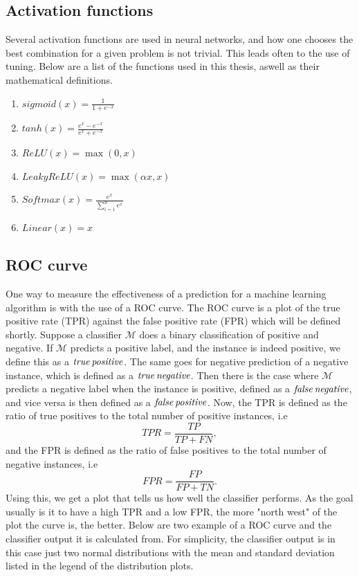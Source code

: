 \subsection*{Activation functions}
Several activation functions are used in neural networks, and how one chooses the best combination for a given problem is not trivial. 
This leads often to the use of tuning. Below are a list of the functions used in this thesis, aswell as their mathematical definitions. 

\begin{enumerate}
    \item  $sigmoid(x) = \frac{1}{1+e^{-x}}$
    \item $tanh(x) = \frac{e^x-e^{-x}}{e^x+e^{-x}}$
    \item $ReLU(x) = \max(0,x)$
    \item $LeakyReLU(x) = \max(\alpha x,x)$
    \item $Softmax(x) = \frac{e^x}{\sum_{i=1}^n e^x}$
    \item $Linear(x) = x$
\end{enumerate}


\subsection*{ROC curve}
One way to measure the effectiveness of a prediction for a machine learning algorithm is with the use of a ROC curve. 
The ROC curve is a plot of the true positive rate (TPR) against the false positive rate (FPR) which will be defined shortly. 
Suppose a classifier $\mathcal{M}$ does a binary classification of positive and negative. If $\mathcal{M}$ predicts a positive 
label, and the instance is indeed positive, we define this as a $\it{true\, positive}$. The same goes for negative prediction of a 
negative instance, which is defined as a $\it{true\, negative}$. Then there is the case where $\mathcal{M}$ predicts a negative label
when the instance is positive, defined as a $\it{false\, negative}$, and vice versa is then defined as a $\it{false\, positive}$\cite{FAWCETT2006861}.
Now, the TPR is defined as the ratio of true positives to the total number of positive instances, i.e 
\begin{equation*}
    TPR = \frac{TP}{TP+FN},
\end{equation*}
and the FPR is defined as the ratio of false positives to the total number of negative instances, i.e
\begin{equation*}
    FPR = \frac{FP}{FP+TN}.
\end{equation*}
Using this, we get a plot that tells us how well the classifier performs. As the goal usually is it to have a high TPR and a low FPR,
the more "north west"\cite{FAWCETT2006861} of the plot the curve is, the better. Below are two example of a ROC curve and the classifier output it 
is calculated from. For simplicity, the classifier output is in this case just two normal distributions with the mean and standard deviation 
listed in the legend of the distribution plots.

